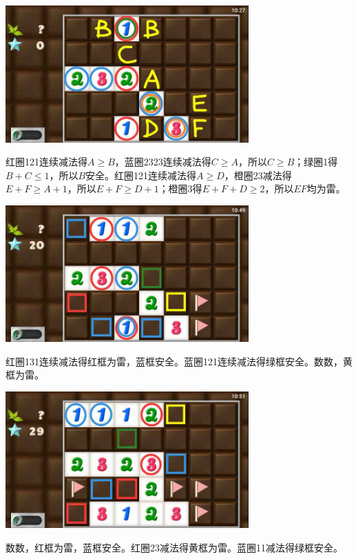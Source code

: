 \subsection{} %
\begin{center}
    \includegraphics[width=0.7\textwidth]{puzzlelow/222-1.jpg}
\end{center}
红圈121连续减法得$A\ge B$，蓝圈2323连续减法得$C\ge A$，所以$C\ge B$；绿圈1得$B+C\le 1$，所以$B$安全。红圈121连续减法得$A\ge D$，橙圈23减法得$E+F\ge A+1$，所以$E+F\ge D+1$；橙圈3得$E+F+D\ge 2$，所以$EF$均为雷。
\begin{center}
    \includegraphics[width=0.7\textwidth]{puzzlelow/222-2.jpg}
\end{center}
红圈131连续减法得红框为雷，蓝框安全。蓝圈121连续减法得绿框安全。数数，黄框为雷。
\begin{center}
    \includegraphics[width=0.7\textwidth]{puzzlelow/222-3.jpg}
\end{center}
数数，红框为雷，蓝框安全。红圈23减法得黄框为雷。蓝圈11减法得绿框安全。
